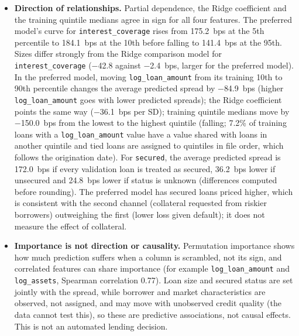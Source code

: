\documentclass[9pt,letterpaper]{extarticle}
\begin{document}
\begin{itemize}
  \item \textbf{Direction of relationships.} Partial dependence, the Ridge coefficient and the training quintile medians agree in sign for all four features. The preferred model's curve for \mbox{\texttt{interest\_coverage}} rises from 175.2~bps at the 5th percentile to 184.1~bps at the 10th before falling to 141.4~bps at the 95th. Sizes differ strongly from the Ridge comparison model for \mbox{\texttt{interest\_coverage}} ($-$42.8 against $-$2.4~bps, larger for the preferred model). In the preferred model, moving \texttt{log\_loan\_amount} from its training 10th to 90th percentile changes the average predicted spread by $-$84.9~bps (higher \texttt{log\_loan\_amount} goes with lower predicted spreads); the Ridge coefficient points the same way ($-$36.1~bps per SD); training quintile medians move by $-$150.0~bps from the lowest to the highest quintile (falling; 7.2\% of training loans with a \texttt{log\_loan\_amount} value have a value shared with loans in another quintile and tied loans are assigned to quintiles in file order, which follows the origination date). For \texttt{secured}, the average predicted spread is 172.0~bps if every validation loan is treated as secured, 36.2~bps lower if unsecured and 24.8~bps lower if status is unknown (differences computed before rounding). The preferred model has secured loans priced higher, which is consistent with the second channel (collateral requested from riskier borrowers) outweighing the first (lower loss given default); it does not measure the effect of collateral.
  \item \textbf{Importance is not direction or causality.} Permutation importance shows how much prediction suffers when a column is scrambled, not its sign, and correlated features can share importance (for example \mbox{\texttt{log\_loan\_amount}} and \mbox{\texttt{log\_assets}}, Spearman correlation 0.77). Loan size and secured status are set jointly with the spread, while borrower and market characteristics are observed, not assigned, and may move with unobserved credit quality (the data cannot test this), so these are predictive associations, not causal effects. This is not an automated lending decision.
\end{itemize}
\end{document}
